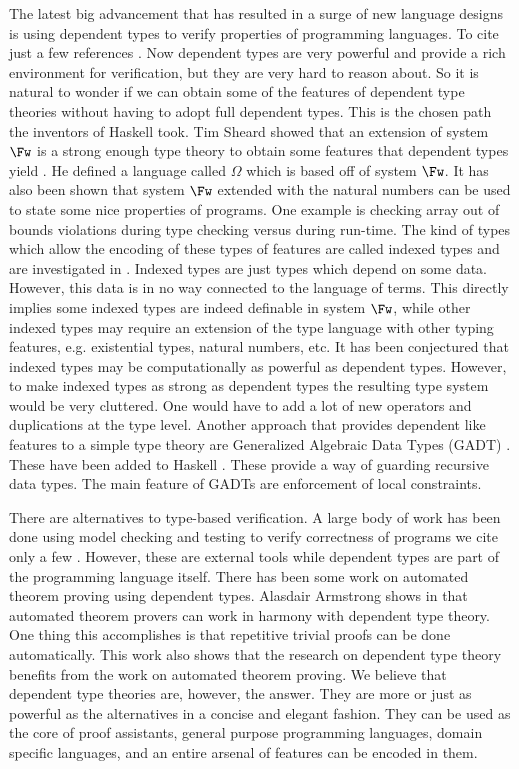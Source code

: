 The latest big advancement that has resulted in a surge of new
language designs is using dependent types to verify properties of
programming languages.  To cite just a few references
\cite{Vytiniotis:2007,Brady:2011,Mcbride:2004,Altenkirch:2003,Norell:2007,Stump:2009,Licata:2005}.
Now dependent types are very powerful and provide a rich environment
for verification, but they are very hard to reason about.  So it is
natural to wonder if we can obtain some of the features of dependent
type theories without having to adopt full dependent types.  This is
the chosen path the inventors of Haskell took.  Tim Sheard showed that
an extension of system $\Fw$ is a strong enough type theory to obtain
some features that dependent types yield \cite{Sheard:2006}.  He
defined a language called $\Omega$ which is based off of system $\Fw$.
It has also been shown that system $\Fw$ extended with the natural
numbers can be used to state some nice properties of programs.  One
example is checking array out of bounds violations during type
checking versus during run-time.  The kind of types which allow the
encoding of these types of features are called indexed types and are
investigated in \cite{Fogarty:2007,Zenger:1997}.  Indexed types are
just types which depend on some data.  However, this data is in no way
connected to the language of terms.  This directly implies some
indexed types are indeed definable in system $\Fw$, while other
indexed types may require an extension of the type language with other
typing features, e.g. existential types, natural numbers, etc.  It has
been conjectured that indexed types may be computationally as powerful
as dependent types.  However, to make indexed types as strong as
dependent types the resulting type system would be very cluttered.
One would have to add a lot of new operators and duplications at the
type level.  Another approach that provides dependent like features to
a simple type theory are Generalized Algebraic Data Types (GADT)
\cite{Xi:2003}.  These have been added to Haskell \cite{Jones:2006}.
These provide a way of guarding recursive data types.  The main
feature of GADTs are enforcement of local constraints.

There are alternatives to type-based verification.  A large
body of work has been done using model checking and testing to verify
correctness of programs we cite only a few
\cite{Andrews:2003,Aspinall:2007,Cousot:2007,Klein:2003,Yang:2006}.
However, these are external tools while dependent types are part of
the programming language itself. There has been some work on automated
theorem proving using dependent types.  Alasdair Armstrong shows in
\cite{Armstrong:2011} that automated theorem provers can work in
harmony with dependent type theory.  One thing this accomplishes is
that repetitive trivial proofs can be done automatically.  This work
also shows that the research on dependent type theory benefits from
the work on automated theorem proving.  We believe that dependent type
theories are, however, the answer.  They are more or just as powerful as
the alternatives in a concise and elegant fashion.  They can be used
as the core of proof assistants, general purpose programming
languages, domain specific languages, and an entire arsenal of
features can be encoded in them.

